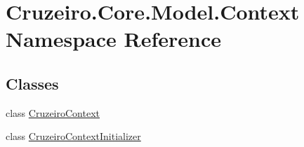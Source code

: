 \hypertarget{namespace_cruzeiro_1_1_core_1_1_model_1_1_context}{}\section{Cruzeiro.\+Core.\+Model.\+Context Namespace Reference}
\label{namespace_cruzeiro_1_1_core_1_1_model_1_1_context}
\subsection*{Classes}
\begin{DoxyCompactItemize}
\item 
class \hyperlink{class_cruzeiro_1_1_core_1_1_model_1_1_context_1_1_cruzeiro_context}{Cruzeiro\+Context}
\item 
class \hyperlink{class_cruzeiro_1_1_core_1_1_model_1_1_context_1_1_cruzeiro_context_initializer}{Cruzeiro\+Context\+Initializer}
\end{DoxyCompactItemize}
